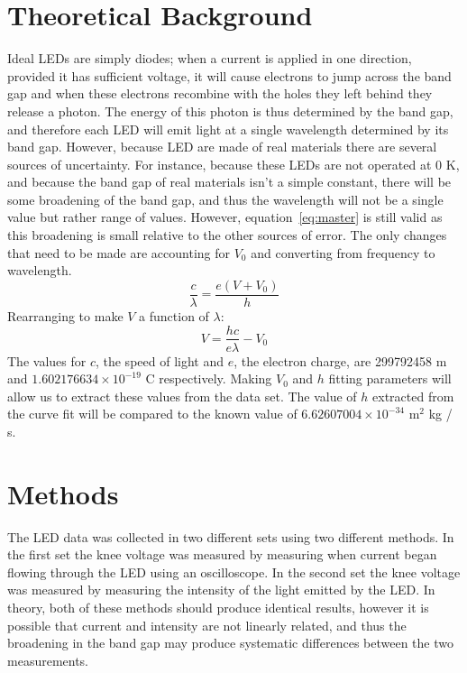 \documentclass[12pt]{spieman}  %
\begin{document}
\begin{spacing}{2}
        \section{Theoretical Background}\label{sec:theoretical-background}
        Ideal LEDs are simply diodes;
        when a current is applied in one direction, provided it has sufficient voltage, it will cause electrons to
        jump across the band gap and when these electrons recombine with the holes they left behind they release a
        photon.\cite{GAYRAL2017453}
        The energy of this photon is thus determined by the band gap, and therefore each LED will emit light at a
        single wavelength determined by its band gap.
        However, because LED are made of real materials there are several sources of uncertainty.
        For instance, because these LEDs are not operated at 0 K, and because the band gap of real materials isn't a
        simple constant, there will be some broadening of the band gap, and thus the wavelength will not be a single
        value but rather range of values.\cite{brown2019iii}
        However, equation~\eqref{eq:master} is still valid as this broadening is small relative to the other sources
        of error.
        The only changes that need to be made are accounting for $V_0$ and converting from frequency to wavelength.
        \begin{equation}
            \label{eq:middle}
            \frac{c}{\lambda}=\frac{e(V+V_0)}{h}
        \end{equation}
        Rearranging to make $V$ a function of $\lambda$:
        \begin{equation}
            \label{eq:final}
            V=\frac{hc}{e\lambda}-V_0
        \end{equation}
        The values for $c$, the speed of light and $e$, the electron charge, are 299792458 m and $1
        .602176634\times10^{-19}$ C respectively.\cite{Newell_2018}
        Making $V_0$ and $h$ fitting parameters will allow us to extract these values from the data set.
        The value of $h$ extracted from the curve fit will be compared to the known value of $6
        .62607004\times10^{-34}$ m$^2$ kg / s.\cite{Newell_2018}


        \section{Methods}\label{sec:methods}
        The LED data was collected in two different sets using two different methods.
        In the first set the knee voltage was measured by measuring when current began flowing through the LED using an
        oscilloscope.
        In the second set the knee voltage was measured by measuring the intensity of the light emitted by the LED\@.
        In theory, both of these methods should produce identical results, however it is possible that current and
        intensity are not linearly related, and thus the broadening in the band gap may produce systematic
        differences between the two measurements.


\end{spacing}
\end{document}
